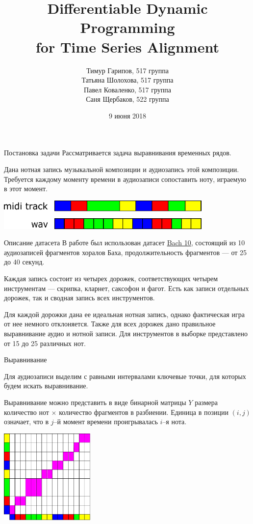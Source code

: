\documentclass[unicode, dvipsnames]{beamer}
\title[Time Series Alignment]{Differentiable Dynamic Programming \\ for Time Series Alignment}
\author{Тимур Гарипов, 517 группа \\ Татьяна Шолохова, 517 группа \\ Павел Коваленко, 517 группа \\ Саня Щербаков, 522 группа}
\date{9 июня 2018}
\begin{document}
\begin{frame}
    \titlepage
\end{frame}

\begin{frame}{Постановка задачи}
	Рассматривается задача выравнивания временных рядов.
	
	\bigskip
	Дана нотная запись музыкальной композиции и аудиозапись этой композиции. Требуется каждому моменту времени в аудиозаписи сопоставить ноту, играемую в этот момент.
	
	\bigskip
	\centering
	\includegraphics[width=0.8\textwidth]{graphics/task.pdf}
\end{frame}

\begin{frame}{Описание датасета}
В работе был использован датасет \href{http://music.cs.northwestern.edu/data/Bach10.html}{Bach 10}, состоящий из 10 аудиозаписей фрагментов хоралов Баха, продолжительность фрагментов --- от 25 до 40 секунд. 

\bigskip
Каждая запись состоит из четырех дорожек, соответствующих четырем инструментам --- скрипка, кларнет, саксофон и фагот. Есть как записи отдельных дорожек, так и сводная запись всех инструментов.

\bigskip
Для каждой дорожки дана ее идеальная нотная запись, однако фактическая игра от нее немного отклоняется. Также для всех дорожек дано правильное выравнивание аудио и нотной записи. Для инструментов в выборке представлено от 15 до 25 различных нот.

\end{frame}

\begin{frame}{Выравнивание}

Для аудиозаписи выделим с равными интервалами ключевые точки, для которых будем искать выравнивание. 

Выравнивание можно представить в виде бинарной матрицы $Y$ размера количество нот $\times$ количество фрагментов в разбиении. Единица в позиции $(i, j)$ означает, что в $j$--й момент времени проигрывалась $i$--я нота.

\bigskip
\centering
\includegraphics[width=0.35\textwidth]{graphics/task2.pdf}
\end{frame}
\end{document}
